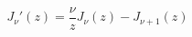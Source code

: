 \documentclass[12pt]{article}
\begin{document}
\begin{displaymath}
J_\nu'(z) = \frac{\nu}{z}J_\nu(z) - J_{\nu+1}(z)
\end{displaymath}
\end{document}
